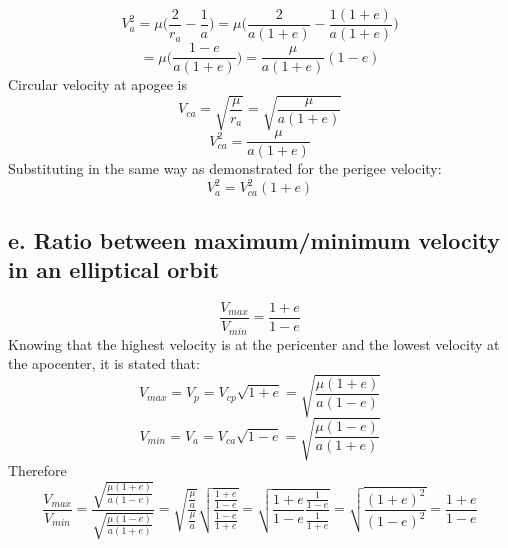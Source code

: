 \begin{equation}
V_a^2=\mu \Big(\frac{2}{r_a}-\frac{1}{a}\Big) = \mu \Big(\frac{2}{a(1+e)}-\frac{1(1+e)}{a(1+e)}\Big)
\end{equation}
\begin{equation}
=\mu \Big(\frac{1-e}{a(1+e)}\Big) = \frac{\mu}{a(1+e)}(1-e)
\end{equation}
Circular velocity at apogee is
\begin{equation}
V_{ca} = \sqrt{\frac{\mu}{r_a}} = \sqrt{\frac{\mu}{a(1+e)}}
\end{equation}
\begin{equation}
V_{ca}^2 = \frac{\mu}{a(1+e)}
\end{equation}
Substituting in the same way as demonstrated for the perigee velocity:
\begin{equation}
V_a^2 = V_{ca}^2(1+e)
\end{equation}
\subsection{e. Ratio between maximum/minimum velocity in an elliptical orbit}
\begin{equation}
\frac{V_{max}}{V_{min}} = \frac{1+e}{1-e}
\end{equation}
Knowing that the highest velocity is at the pericenter and the lowest velocity at the apocenter, it is stated that:
\begin{equation}
V_{max} = V_p = V_{cp} \sqrt{1+e} = \sqrt{\frac{\mu(1+e)}{a(1-e)}}
\end{equation}
\begin{equation}
V_{min} = V_a = V_{ca} \sqrt{1-e} = \sqrt{\frac{\mu(1-e)}{a(1+e)}}
\end{equation}
Therefore
\begin{equation}
\frac{V_{max}}{V_{min}} = \frac{\sqrt{\frac{\mu(1+e)}{a(1-e)}}}{\sqrt{\frac{\mu(1-e)}{a(1+e)}}} =\sqrt{ \frac{\frac{\mu}{a}}{\frac{\mu}{a}}} \sqrt{\frac{\frac{1+e}{1-e}}{\frac{1-e}{1+e}}} = \sqrt{\frac{1+e}{1-e} \frac{\frac{1}{1-e}}{\frac{1}{1+e}}} = \sqrt{\frac{(1+e)^2}{(1-e)^2}} = \frac{1+e}{1-e}
\end{equation}
\clearpage
